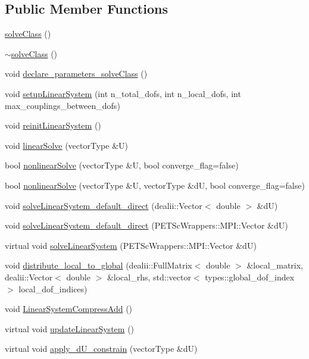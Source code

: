 \subsection*{Public Member Functions}
\begin{DoxyCompactItemize}
\item 
\mbox{\hyperlink{classsolve_class_ac210b30d39cb640ec4d65b667467583d}{solve\+Class}} ()
\item 
\mbox{\hyperlink{classsolve_class_a827189cdd4bd715d08e4cda1695c8409}{$\sim$solve\+Class}} ()
\item 
void \mbox{\hyperlink{classsolve_class_a5cd5eff72b86e1cf736ddfdcbda31db1}{declare\+\_\+parameters\+\_\+solve\+Class}} ()
\item 
void \mbox{\hyperlink{classsolve_class_abcdd7b865378898804f4831f0a078e04}{setup\+Linear\+System}} (int n\+\_\+total\+\_\+dofs, int n\+\_\+local\+\_\+dofs, int max\+\_\+couplings\+\_\+between\+\_\+dofs)
\item 
void \mbox{\hyperlink{classsolve_class_ab8aad4ce80f4f6fe8532c53e4bba67ec}{reinit\+Linear\+System}} ()
\item 
void \mbox{\hyperlink{classsolve_class_a9e6755b7d81862d2a8412de1eec855a7}{linear\+Solve}} (vector\+Type \&U)
\item 
bool \mbox{\hyperlink{classsolve_class_a9522b1c3074e38e3eeaa060a01709580}{nonlinear\+Solve}} (vector\+Type \&U, bool converge\+\_\+flag=false)
\item 
bool \mbox{\hyperlink{classsolve_class_ae8689a33a3a9ed36b59529c53527c5f9}{nonlinear\+Solve}} (vector\+Type \&U, vector\+Type \&dU, bool converge\+\_\+flag=false)
\item 
void \mbox{\hyperlink{classsolve_class_aaed39c6902f1e1de684583e56fb14f66}{solve\+Linear\+System\+\_\+default\+\_\+direct}} (dealii\+::\+Vector$<$ double $>$ \&dU)
\item 
void \mbox{\hyperlink{classsolve_class_ac888eaa37061db46d24d90065b733a82}{solve\+Linear\+System\+\_\+default\+\_\+direct}} (P\+E\+T\+Sc\+Wrappers\+::\+M\+P\+I\+::\+Vector \&dU)
\item 
virtual void \mbox{\hyperlink{classsolve_class_a31c22340527a596f8d6aeeea60ffe52a}{solve\+Linear\+System}} (P\+E\+T\+Sc\+Wrappers\+::\+M\+P\+I\+::\+Vector \&dU)
\item 
void \mbox{\hyperlink{classsolve_class_af9e8a3e1a38280c43f242bbeb7139f00}{distribute\+\_\+local\+\_\+to\+\_\+global}} (dealii\+::\+Full\+Matrix$<$ double $>$ \&local\+\_\+matrix, dealii\+::\+Vector$<$ double $>$ \&local\+\_\+rhs, std\+::vector$<$ types\+::global\+\_\+dof\+\_\+index $>$ local\+\_\+dof\+\_\+indices)
\item 
void \mbox{\hyperlink{classsolve_class_ad7659997bee5e782a6eaa46db001b66a}{Linear\+System\+Compress\+Add}} ()
\item 
virtual void \mbox{\hyperlink{classsolve_class_af78c2c6284234c93872188334fb997d8}{update\+Linear\+System}} ()
\item 
virtual void \mbox{\hyperlink{classsolve_class_a029ece57f667fa697cb29eb482eff31b}{apply\+\_\+d\+U\+\_\+constrain}} (vector\+Type \&dU)
\end{DoxyCompactItemize}

